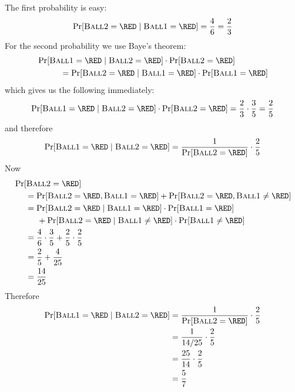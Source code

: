 The first probability is easy:
\[
\Pr[\BALLTWO = \RED \mid \BALLONE = \RED] = \frac{4}{6} = \frac{2}{3}
\]
For the second probability we use Baye's theorem:
\begin{align*}
&\Pr[\BALLONE = \RED \mid \BALLTWO = \RED] \cdot \Pr[\BALLTWO = \RED]  \\
&\hspace{1cm} = \Pr[\BALLTWO = \RED \mid \BALLONE = \RED] \cdot \Pr[\BALLONE = \RED] 
\end{align*}
which gives us the following immediately:
\begin{align*}
\Pr[\BALLONE = \RED \mid \BALLTWO = \RED] \cdot \Pr[\BALLTWO = \RED]
= \frac{2}{3} \cdot \frac{3}{5} = \frac{2}{5}
\end{align*}
and therefore
\[
\Pr[\BALLONE = \RED \mid \BALLTWO = \RED]  
= 
\frac{1}{\Pr[\BALLTWO = \RED]} \cdot \frac{2}{5}
\]
Now
\begin{align*} 
  &\Pr[\BALLTWO = \RED] \\
  &\hspace{0.5cm} =
    \Pr[\BALLTWO=\RED,  \BALLONE=\RED] 
    + 
    \Pr[\BALLTWO=\RED,  \BALLONE \neq \RED] \\
  &\hspace{0.5cm} =
    \Pr[\BALLTWO=\RED \mid  \BALLONE=\RED] \cdot \Pr[\BALLONE=\RED] \\
  &\hspace{1cm} + 
    \Pr[\BALLTWO=\RED \mid  \BALLONE \neq \RED] \cdot \Pr[\BALLONE \neq \RED] \\
  &\hspace{0.5cm} =
    \frac{4}{6} \cdot \frac{3}{5} +
    \frac{2}{5} \cdot \frac{2}{5} \\
  &\hspace{0.5cm} =
    \frac{2}{5} +
    \frac{4}{25} \\
  &\hspace{0.5cm} = \frac{14}{25}
\end{align*}
Therefore
\begin{align*}
\Pr [ \BALLONE = \RED \mid \BALLTWO = \RED ]
&= \frac{1}{\Pr[\BALLTWO = \RED]} \cdot \frac{2}{5} \\
&= \frac{1}{14/25} \cdot \frac{2}{5} \\
&= \frac{25}{14} \cdot \frac{2}{5} \\ 
&= \frac{5}{7} 
\end{align*}

